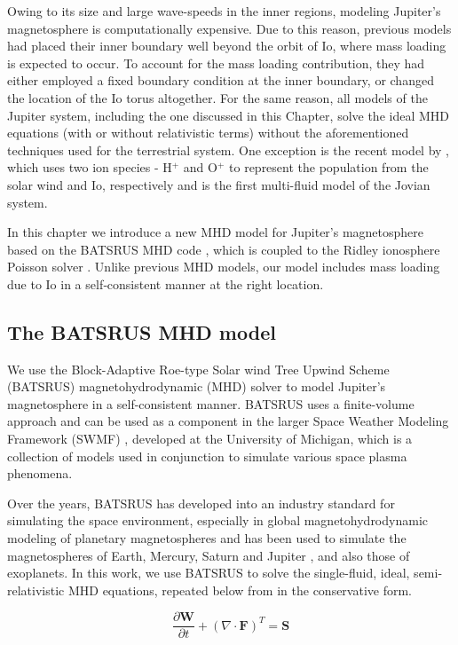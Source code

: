 Owing to its size and large wave-speeds in the inner regions, modeling Jupiter's magnetosphere is computationally expensive. Due to this reason, previous models had placed their inner boundary well beyond the orbit of Io, where mass loading is expected to occur. To account for the mass loading contribution, they had either employed a fixed boundary condition at the inner boundary, or changed the location of the Io torus altogether. For the same reason, all models of the Jupiter system, including the one discussed in this Chapter, solve the ideal MHD equations (with or without relativistic terms) without the aforementioned techniques used for the terrestrial system. One exception is the recent model by , which uses two ion species - H$^+$ and O$^+$ to represent the population from the solar wind and Io, respectively and is the first multi-fluid model of the Jovian system. 

In this chapter we introduce a new MHD model for Jupiter's magnetosphere based on the BATSRUS MHD code \cite{Powell1999a,Gombosi2002b}, which is coupled to the Ridley ionosphere Poisson solver \cite{Ridley2004IonosphericConductance}. Unlike previous MHD models, our model includes mass loading due to Io in a self‐consistent manner at the right location.

\subsection{The BATSRUS MHD model}
We use the Block-Adaptive Roe-type Solar wind Tree Upwind Scheme (BATSRUS) magnetohydrodynamic (MHD) solver to model Jupiter's magnetosphere in a self-consistent manner. BATSRUS uses a finite-volume approach and can be used as a component in the larger Space Weather Modeling Framework (SWMF) \cite{Toth2012a}, developed at the University of Michigan, which is a collection of models used in conjunction to simulate various space plasma phenomena. 

Over the years, BATSRUS has developed into an industry standard for simulating the space environment, especially in global magnetohydrodynamic modeling of planetary magnetospheres and has been used to simulate the magnetospheres of Earth, Mercury, Saturn \cite{Jia2012} and Jupiter \cite{Hansen2001a}, and also those of exoplanets. In this work, we use BATSRUS to solve the single-fluid, ideal, semi-relativistic MHD equations, repeated below from  in the conservative form. 

\begin{equation}
    \frac{\partial \mathbf{W}}{\partial t} + \left(\nabla \cdot \mathbf{F} \right)^T = \mathbf{S}
\end{equation}

